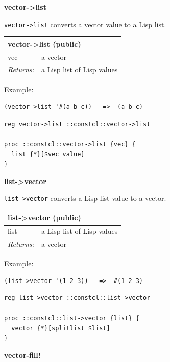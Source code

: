 \documentclass[twoside,9pt]{report}
\begin{document}
\textbf{vector->list}


\texttt{vector->list} converts a vector value to a Lisp list.

\begin{tabular}{ |l l| }
\hline
\multicolumn{2}{|l|}{vector->list (public)} \\
\hline
vec & a vector \\
\textit{Returns:} & a Lisp list of Lisp values \\
\hline
\end{tabular}


Example:

\noindent\makebox[\linewidth]{\rule{\linewidth}{0.4pt}}
\begin{lstlisting}
(vector->list '#(a b c))   =>  (a b c)
\end{lstlisting}
\noindent\makebox[\linewidth]{\rule{\linewidth}{0.4pt}}
\noindent\makebox[\linewidth]{\rule{\linewidth}{0.4pt}}
\begin{lstlisting}
reg vector->list ::constcl::vector->list
 
proc ::constcl::vector->list {vec} {
  list {*}[$vec value]
}
\end{lstlisting}
\noindent\makebox[\linewidth]{\rule{\linewidth}{0.4pt}}

\textbf{list->vector}


\texttt{list->vector} converts a Lisp list value to a vector.

\begin{tabular}{ |l l| }
\hline
\multicolumn{2}{|l|}{list->vector (public)} \\
\hline
list & a Lisp list of Lisp values \\
\textit{Returns:} & a vector \\
\hline
\end{tabular}


Example:

\noindent\makebox[\linewidth]{\rule{\linewidth}{0.4pt}}
\begin{lstlisting}
(list->vector '(1 2 3))   =>  #(1 2 3)
\end{lstlisting}
\noindent\makebox[\linewidth]{\rule{\linewidth}{0.4pt}}
\noindent\makebox[\linewidth]{\rule{\linewidth}{0.4pt}}
\begin{lstlisting}
reg list->vector ::constcl::list->vector
 
proc ::constcl::list->vector {list} {
  vector {*}[splitlist $list]
}
\end{lstlisting}
\noindent\makebox[\linewidth]{\rule{\linewidth}{0.4pt}}

\textbf{vector-fill!}
\end{document}

